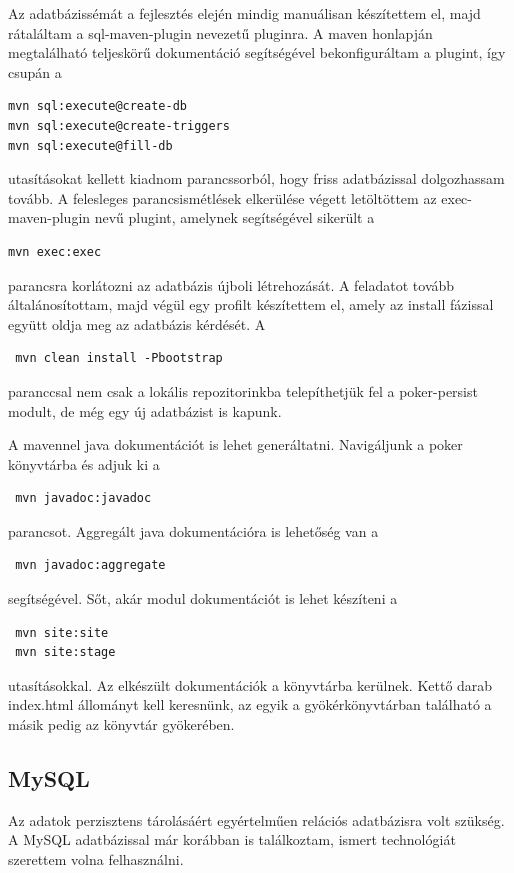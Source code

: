 Az adatbázissémát a fejlesztés elején mindig manuálisan készítettem el, majd rátaláltam a sql-maven-plugin nevezetű pluginra. A maven honlapján megtalálható teljeskörű dokumentáció segítségével bekonfiguráltam a plugint, így csupán a
 \begin{verbatim}
mvn sql:execute@create-db
mvn sql:execute@create-triggers
mvn sql:execute@fill-db
\end{verbatim}
utasításokat kellett kiadnom parancssorból, hogy friss adatbázissal dolgozhassam tovább. A felesleges parancsismétlések elkerülése végett letöltöttem az exec-maven-plugin nevű plugint, amelynek segítségével sikerült a 
 \begin{verbatim}
mvn exec:exec
\end{verbatim}
parancsra korlátozni az adatbázis újboli létrehozását. A feladatot tovább általánosítottam, majd végül egy profilt készítettem el, amely az install fázissal együtt oldja meg az adatbázis kérdését. A 
 \begin{verbatim}
 mvn clean install -Pbootstrap
 \end{verbatim}
paranccsal nem csak a lokális repozitorinkba telepíthetjük fel a poker-persist modult, de még egy új adatbázist is kapunk.

A mavennel java dokumentációt is lehet generáltatni. Navigáljunk a poker könyvtárba és adjuk ki a
\begin{verbatim}
 mvn javadoc:javadoc
\end{verbatim}
 parancsot. Aggregált java dokumentációra is lehetőség van a 
 \begin{verbatim}
 mvn javadoc:aggregate
\end{verbatim}
segítségével. Sőt, akár modul dokumentációt is lehet készíteni a 
\begin{verbatim}
 mvn site:site
 mvn site:stage
\end{verbatim}
utasításokkal. Az elkészült dokumentációk a  könyvtárba kerülnek. Kettő darab index.html állományt kell keresnünk, az egyik a gyökérkönyvtárban található a másik pedig az  könyvtár gyökerében.
 
\subsection{MySQL}
Az adatok perzisztens tárolásáért egyértelműen relációs adatbázisra volt szükség. A MySQL adatbázissal már korábban is találkoztam, ismert technológiát szerettem volna felhasználni.

